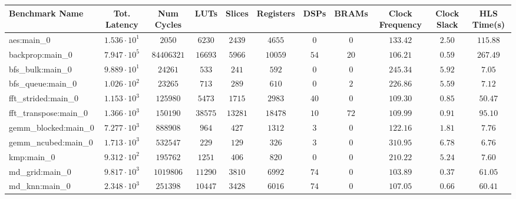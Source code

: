 \begin{tabular}{|l|c|c|c|c|c|c|c|c|c|c|}
\hline
Benchmark Name         & Tot. Latency           & Num Cycles   & LUTs       & Slices    & Registers & DSPs    & BRAMs   & Clock Frequency & Clock Slack & HLS Time(s) \\
\hline
aes:main\_0            & $ 1.536 \cdot 10^{1} $ & $ 2050     $ & $ 6230   $ & $ 2439  $ & $ 4655  $ & $ 0   $ & $ 0   $ & $ 133.42      $ & $ 2.50    $ & $ 115.88  $ \\
backprop:main\_0       & $ 7.947 \cdot 10^{5} $ & $ 84406321 $ & $ 16693  $ & $ 5966  $ & $ 10059 $ & $ 54  $ & $ 20  $ & $ 106.21      $ & $ 0.59    $ & $ 267.49  $ \\
bfs\_bulk:main\_0      & $ 9.889 \cdot 10^{1} $ & $ 24261    $ & $ 533    $ & $ 241   $ & $ 592   $ & $ 0   $ & $ 0   $ & $ 245.34      $ & $ 5.92    $ & $ 7.05    $ \\
bfs\_queue:main\_0     & $ 1.026 \cdot 10^{2} $ & $ 23265    $ & $ 713    $ & $ 289   $ & $ 610   $ & $ 0   $ & $ 2   $ & $ 226.86      $ & $ 5.59    $ & $ 7.12    $ \\
fft\_strided:main\_0   & $ 1.153 \cdot 10^{3} $ & $ 125980   $ & $ 5473   $ & $ 1715  $ & $ 2983  $ & $ 40  $ & $ 0   $ & $ 109.30      $ & $ 0.85    $ & $ 50.47   $ \\
fft\_transpose:main\_0 & $ 1.366 \cdot 10^{3} $ & $ 150190   $ & $ 38575  $ & $ 13281 $ & $ 18478 $ & $ 10  $ & $ 72  $ & $ 109.99      $ & $ 0.91    $ & $ 95.10   $ \\
gemm\_blocked:main\_0  & $ 7.277 \cdot 10^{3} $ & $ 888908   $ & $ 964    $ & $ 427   $ & $ 1312  $ & $ 3   $ & $ 0   $ & $ 122.16      $ & $ 1.81    $ & $ 7.76    $ \\
gemm\_ncubed:main\_0   & $ 1.713 \cdot 10^{3} $ & $ 532547   $ & $ 229    $ & $ 129   $ & $ 326   $ & $ 3   $ & $ 0   $ & $ 310.95      $ & $ 6.78    $ & $ 6.76    $ \\
kmp:main\_0            & $ 9.312 \cdot 10^{2} $ & $ 195762   $ & $ 1251   $ & $ 406   $ & $ 820   $ & $ 0   $ & $ 0   $ & $ 210.22      $ & $ 5.24    $ & $ 7.60    $ \\
md\_grid:main\_0       & $ 9.817 \cdot 10^{3} $ & $ 1019806  $ & $ 11290  $ & $ 3810  $ & $ 6992  $ & $ 74  $ & $ 0   $ & $ 103.89      $ & $ 0.37    $ & $ 61.05   $ \\
md\_knn:main\_0        & $ 2.348 \cdot 10^{3} $ & $ 251398   $ & $ 10447  $ & $ 3428  $ & $ 6016  $ & $ 74  $ & $ 0   $ & $ 107.05      $ & $ 0.66    $ & $ 60.41   $ \\

\end{tabular}
